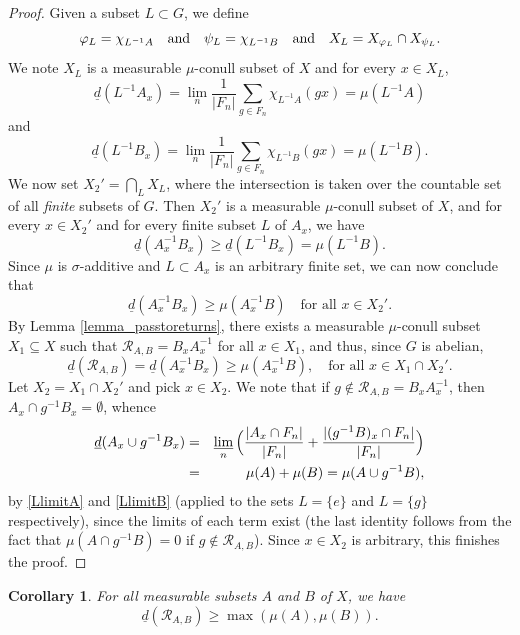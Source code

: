 \documentclass[10pt]{amsart}
\let\mathcal\mathscr
\newcommand{\cR}{\mathcal{R}}
\newcommand{\qand}{\quad\textup{and}\quad}
\theoremstyle{plain}
\newtheorem{corollary}[theorem]{Corollary}
\theoremstyle{definition}
\begin{document}
\begin{proof}
Given a subset $L \subset G$, we define
\[
\varphi_L = \chi_{L^{-1}A} \qand \psi_L = \chi_{L^{-1}B} \qand X_L = X_{\varphi_L} \cap X_{\psi_L}.
\]
We note $X_L$ is a measurable $\mu$-conull subset of $X$ and for every $x \in X_L$,
\begin{equation}
\label{LlimitA}
\underline{d}(L^{-1}A_x) = \lim_n \frac{1}{|F_n|} \sum_{g \in F_n} \chi_{L^{-1}A}(gx) = \mu(L^{-1}A)
\end{equation}
and
\begin{equation}
\label{LlimitB}
\underline{d}(L^{-1}B_x) = \lim_n \frac{1}{|F_n|} \sum_{g \in F_n} \chi_{L^{-1}B}(gx) = \mu(L^{-1}B).
\end{equation}
We now set $X_2' = \bigcap_{L} X_L$, where the intersection is taken over the countable set of all \emph{finite} subsets of $G$. Then
$X_2'$ is a measurable $\mu$-conull subset of $X$, and for every $x \in X_2'$ and for every finite subset $L$ of $A_x$, we have
\[
\underline{d}(A_x^{-1}B_x) \geq \underline{d}(L^{-1}B_x) = \mu(L^{-1}B).
\]
Since $\mu$ is $\sigma$-additive and $L \subset A_x$ is an arbitrary finite set, we can now conclude that
\[
\underline{d}(A_x^{-1}B_x) \geq \mu(A_x^{-1}B) \quad \textrm{for all $x \in X_2'$}.
\]
By Lemma \ref{lemma_passtoreturns}, there exists a measurable $\mu$-conull subset $X_1 \subseteq X$ such that
$\cR_{A,B} = B_x A_x^{-1}$ for all $x \in X_1$, and thus, since $G$ is abelian,
\[
\underline{d}(\cR_{A,B}) = \underline{d}(A_x^{-1}B_x) \geq \mu(A_x^{-1}B), \quad \textrm{for all $x \in X_1 \cap X_2'$}.
\]
Let $X_2 = X_1 \cap X_2'$ and pick $x \in X_2$. We note that if $g \notin \cR_{A,B} = B_x A_x^{-1}$, then $A_x \cap g^{-1}B_x = \emptyset$,
whence
\begin{eqnarray*}
\underline{d}(A_x \cup g^{-1}B_x)
&=&
\varliminf_n \Big( \frac{|A_x \cap F_n|}{|F_n|} + \frac{|(g^{-1}B)_x \cap F_n|}{|F_n|} \Big) \\
&=&
\mu(A) + \mu(B) = \mu(A \cup g^{-1}B),
\end{eqnarray*}
by \eqref{LlimitA} and \eqref{LlimitB} (applied to the sets $L = \{e\}$ and $L = \{g\}$ respectively), since the limits of each term exist
(the last identity follows from the fact that $\mu(A \cap g^{-1}B) = 0$ if $g \notin \cR_{A,B}$). Since $x \in X_2$ is arbitrary, this finishes the proof.
\end{proof}

\begin{corollary}
\label{cor_max}
For all measurable subsets $A$ and $B$ of $X$, we have
\[
\underline{d}(\cR_{A,B}) \geq \max(\mu(A),\mu(B)).
\]
\end{corollary}
\end{document}
